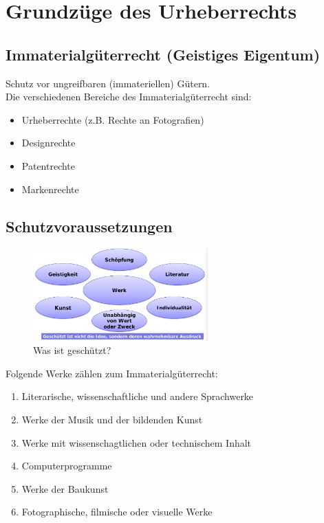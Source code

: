 \section{Grundzüge des Urheberrechts}

\subsection{Immaterialgüterrecht (Geistiges Eigentum)}
Schutz vor ungreifbaren (immateriellen) Gütern.\\
Die verschiedenen Bereiche des Immaterialgüterrecht sind:
\begin{itemize}
	\tightlist
	\item Urheberrechte (z.B. Rechte an Fotografien)
	\item Designrechte
	\item Patentrechte
	\item Markenrechte
\end{itemize}

\subsection{Schutzvoraussetzungen}
\label{sec:Urheberrecht-Schutzvoraussetzugen}

\begin{figure}[H]
	\centering
	\includegraphics[width=0.6\textwidth]{figures/urheberrechtsSchutz.png}
	\caption{Was ist geschützt?}
\end{figure}

Folgende Werke zählen zum Immaterialgüterrecht:
\begin{enumerate}
\tightlist
\item Literarische, wissenschaftliche und andere Sprachwerke
\item Werke der Musik und der bildenden Kunst
\item Werke mit wissenschagtlichen oder technischem Inhalt
\item Computerprogramme
\item Werke der Baukunst
\item Fotographische, filmische oder visuelle Werke
\end{enumerate}

